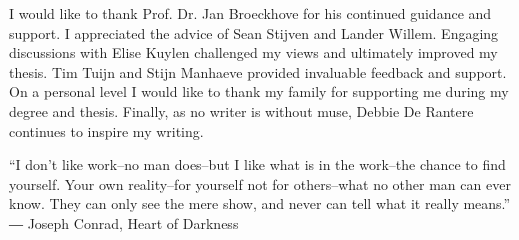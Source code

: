 I would like to thank Prof. Dr. Jan Broeckhove for his continued guidance and support. 
I appreciated the advice of Sean Stijven and Lander Willem.
Engaging discussions with Elise Kuylen challenged my views and ultimately improved my thesis. Tim Tuijn and Stijn Manhaeve provided invaluable feedback and support.
On a personal level I would like to thank my family for supporting me during my degree and thesis. 
Finally, as no writer is without muse, Debbie De Rantere continues to inspire my writing. \\

%
\begin{displayquote}
“I don't like work--no man does--but I like what is in the work--the chance to find yourself. Your own reality--for yourself not for others--what no other man can ever know. They can only see the mere show, and never can tell what it really means.” \\
― Joseph Conrad, Heart of Darkness
\end{displayquote}

